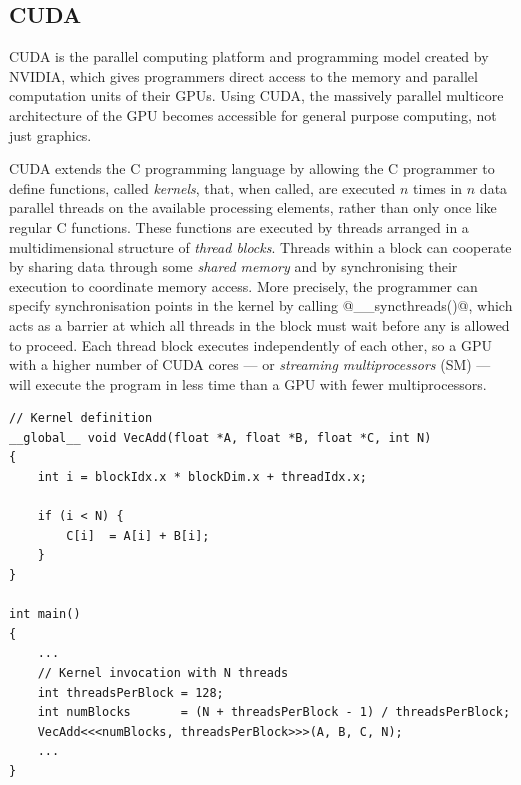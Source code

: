 \subsection{CUDA}
\label{sec:cuda}

CUDA is the parallel computing platform and programming model
created by NVIDIA, which gives programmers direct access to the memory and
parallel computation units of their GPUs. Using CUDA, the massively parallel
multicore architecture of the GPU becomes accessible for general purpose
computing, not just graphics.

CUDA extends the C programming language by allowing the C programmer to define
functions, called \emph{kernels}, that, when called, are
executed $n$ times in $n$ data parallel threads on the available processing
elements, rather than only once like regular C functions. These functions are
executed by threads arranged in a multidimensional structure of \emph{thread
blocks}. Threads within a block can cooperate by sharing
data through some \emph{shared memory} and by
synchronising their execution to coordinate memory access. More precisely, the
programmer can specify synchronisation points in the kernel by calling
@__syncthreads()@, which acts as a barrier at
which all threads in the block must wait before any is allowed to proceed. Each
thread block executes independently of each other, so a GPU with a higher number
of CUDA cores --- or \emph{streaming multiprocessors} (SM) --- will execute the program in less time than a GPU with
fewer multiprocessors.

\begin{lstlisting}[style=cuda
    ,float
    ,label=lst:cuda_vecadd
    ,caption={[CUDA kernel for pair wise addition of two vectors]A CUDA kernel
        that illustrates pair wise addition of two vectors. The
        \code{__global__} keyword marks a function as a kernel that should be
        executed on the GPU in data parallel. The execution configuration syntax
        \code{<<<...>>>} specifies the number of threads that will each execute
        the function in data parallel.}]
// Kernel definition
__global__ void VecAdd(float *A, float *B, float *C, int N)
{
    int i = blockIdx.x * blockDim.x + threadIdx.x;

    if (i < N) {
        C[i]  = A[i] + B[i];
    }
}

int main()
{
    ...
    // Kernel invocation with N threads
    int threadsPerBlock = 128;
    int numBlocks       = (N + threadsPerBlock - 1) / threadsPerBlock;
    VecAdd<<<numBlocks, threadsPerBlock>>>(A, B, C, N);
    ...
}
\end{lstlisting}

